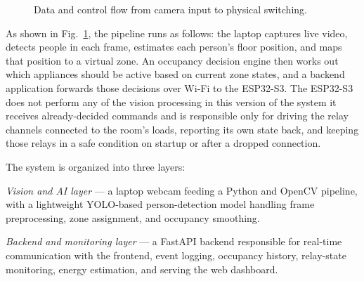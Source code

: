 \documentclass[conference]{IEEEtran}
\begin{document}
\begin{figure}[htbp]
\centering
{}
\caption{Data and control flow from camera input to physical switching.}
\label{fig:architecture}
\end{figure}

As shown in Fig.~\ref{fig:architecture}, the pipeline runs as follows: the laptop captures live video, detects people in each frame, estimates each person's floor position, and maps that position to a virtual zone. An occupancy decision engine then works out which appliances should be active based on current zone states, and a backend application forwards those decisions over Wi-Fi to the ESP32-S3. The ESP32-S3 does not perform any of the vision processing in this version of the system it receives already-decided commands and is responsible only for driving the relay channels connected to the room's loads, reporting its own state back, and keeping those relays in a safe condition on startup or after a dropped connection.

The system is organized into three layers:

\textit{Vision and AI layer} --- a laptop webcam feeding a Python and OpenCV pipeline, with a lightweight YOLO-based person-detection model handling frame preprocessing, zone assignment, and occupancy smoothing.

\textit{Backend and monitoring layer} --- a FastAPI backend responsible for real-time communication with the frontend, event logging, occupancy history, relay-state monitoring, energy estimation, and serving the web dashboard.
\end{document}
